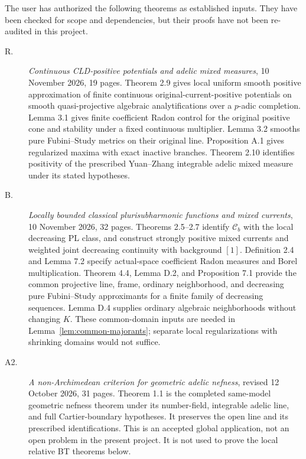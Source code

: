 \documentclass[11pt,a4paper]{article}
\numberwithin{equation}{section}
\theoremstyle{definition}
\theoremstyle{remark}
\newcommand{\Cb}{\mathcal C_b}
\begin{document}
The user has authorized the following theorems as established inputs.
They have been checked for scope and dependencies, but their proofs
have not been re-audited in this project.

\begin{description}
\item[\textup{R}.] \emph{Continuous CLD-positive potentials and adelic
mixed measures}, 10 November 2026, 19 pages.
Theorem 2.9 gives local uniform smooth positive approximation of finite
continuous original-current-positive potentials on smooth
quasi-projective algebraic analytifications over a $p$-adic completion.
Lemma 3.1 gives finite coefficient Radon control for the original
positive cone and stability under a fixed continuous multiplier.
Lemma 3.2 smooths pure Fubini--Study metrics on their original line.
Proposition A.1 gives regularized maxima with exact inactive branches.
Theorem 2.10 identifies positivity of the prescribed Yuan--Zhang
integrable adelic mixed measure under its stated hypotheses.

\item[\textup{B}.] \emph{Locally bounded classical plurisubharmonic
functions and mixed currents}, 10 November 2026, 32 pages.
Theorems 2.5--2.7 identify $\Cb$ with the local decreasing PL class,
and construct strongly positive mixed currents and weighted joint
decreasing continuity with background $[1]$.
Definition 2.4 and Lemma 7.2 specify actual-space coefficient Radon
measures and Borel multiplication.
Theorem 4.4, Lemma D.2, and Proposition 7.1 provide the common
projective line, frame, ordinary neighborhood, and decreasing pure
Fubini--Study approximants for a finite family of decreasing sequences.
Lemma D.4 supplies ordinary algebraic neighborhoods without changing
$K$. These common-domain inputs are needed in
Lemma~\ref{lem:common-majorants}; separate local regularizations with
shrinking domains would not suffice.

\item[\textup{A2}.] \emph{A non-Archimedean criterion for geometric
adelic nefness}, revised 12 October 2026, 31 pages.
Theorem 1.1 is the completed same-model geometric nefness theorem under
its number-field, integrable adelic line, and full Cartier-boundary
hypotheses. It preserves the open line and its prescribed
identifications. This is an accepted global application, not an open
problem in the present project. It is not used to prove the local
relative BT theorems below.
\end{description}
\end{document}
